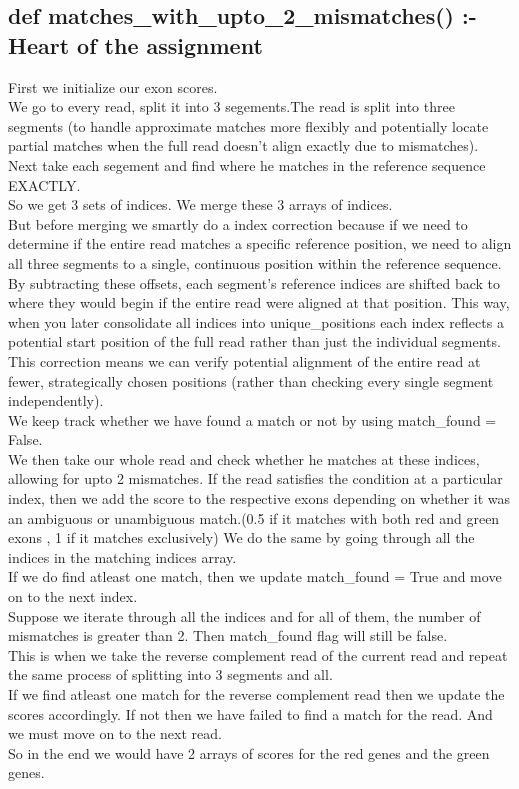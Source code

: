 \documentclass{article}
\begin{document}
\subsection{def matches\_with\_upto\_2\_mismatches() :- Heart of the assignment}
First we initialize our exon scores.\\
We go to every read, split it into 3 segements.The read is split into three segments (to handle approximate matches more flexibly and potentially locate partial matches when the full read doesn't align exactly due to mismatches). Next take each segement and find where he matches in the reference sequence EXACTLY.\\
So we get 3 sets of indices. We merge these 3 arrays of indices.\\
But before merging we smartly do a index correction because if we need to determine if the entire read matches a specific reference position, we need to align all three segments to a single, continuous position within the reference sequence.\\
By subtracting these offsets, each segment’s reference indices are shifted back to where they would begin if the entire read were aligned at that position. This way, when you later consolidate all indices into unique\_positions each index reflects a potential start position of the full read rather than just the individual segments.\\
This correction means we can verify potential alignment of the entire read at fewer, strategically chosen positions (rather than checking every single segment independently).\\
We keep track whether we have found a match or not by using match\_found = False.\\
We then take our whole read and check whether he matches at these indices, allowing for upto 2 mismatches. If the read satisfies the condition at a particular index, then we add the score to the respective exons depending on whether it was an ambiguous or unambiguous match.(0.5 if it matches with both red and green exons , 1 if it matches exclusively) We do the same by going through all the indices in the matching indices array.\\
If we do find atleast one match, then we update match\_found = True and move on to the next index.\\
Suppose we iterate through all the indices and for all of them, the number of mismatches is greater than 2. Then match\_found flag will still be false.\\
This is when we take the reverse complement read of the current read and repeat the same process of splitting into 3 segments and all.\\
If we find atleast one match for the reverse complement read then we update the scores accordingly. If not then we have failed to find a match for the read. And we must move on to the next read.\\
So in the end we would have 2 arrays of scores for the red genes and the green genes.
\end{document}
